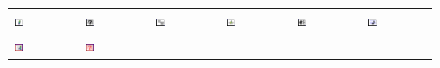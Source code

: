 \documentclass[book.tex]{subfiles}
\begin{document}
\par 
\begin{figure}[H]
\centering
 \begin{table}[H]
  \begin{tabularx}{\textwidth}[c]{XXXXXX}
  \includegraphics[width=0.15\textwidth]{screenshots_300dpi/game/picture01.jpg} &
  \includegraphics[width=0.15\textwidth]{screenshots_300dpi/game/picture02.jpg} &
  \includegraphics[width=0.15\textwidth]{screenshots_300dpi/game/picture03.jpg} &
  \includegraphics[width=0.15\textwidth]{screenshots_300dpi/game/picture04.jpg} &
  \includegraphics[width=0.15\textwidth]{screenshots_300dpi/game/picture5.png} &
  \includegraphics[width=0.15\textwidth]{screenshots_300dpi/game/picture6.png} \\
  \includegraphics[width=0.15\textwidth]{screenshots_300dpi/game/picture7.png} &
  \includegraphics[width=0.15\textwidth]{screenshots_300dpi/game/picture8.png} &

\end{tabularx}
\end{table}
\end{figure}
\end{document}
